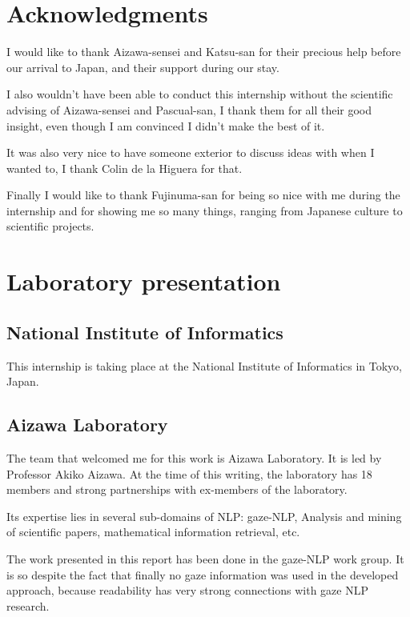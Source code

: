 \documentclass[a4paper, 11pt, onepage]{scrreprt}
\begin{document}
\tableofcontents

\chapter{Acknowledgments}

I would like to thank Aizawa-sensei and Katsu-san for their precious
help before our arrival to Japan, and their support during our stay.

I also wouldn't have been able to conduct this internship without the
scientific advising of Aizawa-sensei and Pascual-san, I thank them for
all their good insight, even though I am convinced I didn't make the
best of it.

It was also very nice to have someone exterior to discuss ideas with
when I wanted to, I thank Colin de la Higuera for that.

Finally I would like to thank Fujinuma-san for being so nice with me
during the internship and for showing me so many things, ranging from
Japanese culture to scientific projects.

\chapter{Laboratory presentation}

\section{National Institute of Informatics}
\label{sec:national-institute-of-informatics}

This internship is taking place at the National Institute of
Informatics in Tokyo, Japan.

\section{Aizawa Laboratory}
\label{sec:aizawa-laboratory}

The team that welcomed me for this work is Aizawa Laboratory. It is
led by Professor Akiko Aizawa. At the time of this writing, the
laboratory has 18 members and strong partnerships with ex-members of
the laboratory.

Its expertise lies in several sub-domains of NLP: gaze-NLP, Analysis
and mining of scientific papers, mathematical information retrieval,
etc.

The work presented in this report has been done in the gaze-NLP
work group. It is so despite the fact that finally no gaze information
was used in the developed approach, because readability has very
strong connections with gaze NLP research.
\end{document}
